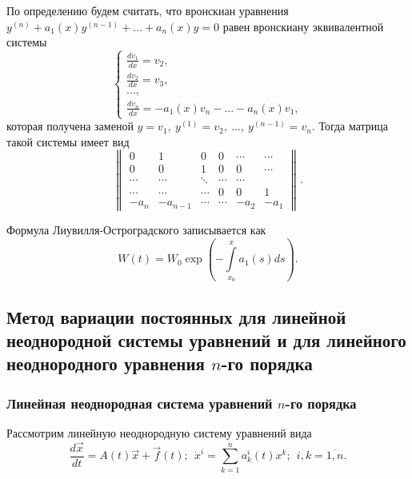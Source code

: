 По определению будем считать, что вронскиан уравнения $y^{(n)} + a_1(x) y^{(n - 1)} + \dots + a_n(x)y = 0$ равен вронскиану эквивалентной системы
\begin{equation*}
  \begin{cases}
    \frac{dv_1}{dx} = v_2,
    \\
    \frac{dv_2}{dx} = v_3,
    \\
    ...,
    \\
    \frac{dv_n}{dx} = - a_1(x)v_n - ... - a_n(x)v_1,
  \end{cases}
\end{equation*}
которая получена заменой $y = v_1, ~y^{(1)} = v_2,~..., ~y^{(n-1)} = v_n$. Тогда матрица такой системы имеет вид
\begin{equation*}
  \begin{Vmatrix*} 0 & 1 & 0 & 0 &\cdots & \cdots \\
                    0 & 0 & 1 & 0 & 0 & \cdots      \\
    \cdots & \cdots & \ddots & \cdots & \cdots \\
    \cdots & \cdots & \cdots & 0 & 0 & 1 \\ 
    -a_n & -a_{n-1} & \cdots & \cdots & -a_2 & -a_1
  \end{Vmatrix*}.
\end{equation*}

Формула Лиувилля-Остроградского записывается как
\begin{equation*}
  W(t) = W_0\exp{\left( -\int\limits_{x_0}^{x}a_1(s) ds\right)}.
\end{equation*}

\subsection{Метод вариации постоянных для линейной неоднородной системы уравнений и для линейного неоднородного уравнения $n$-го порядка}

\subsubsection{Линейная неоднородная система уравнений $n$-го порядка}

Рассмотрим линейную неоднородную систему уравнений вида
\begin{equation}
  \frac{d \overrightarrow x}{dt} = A(t) \overrightarrow x + \overrightarrow{f}(t); ~~ \dot x^i = \sum^n_{k = 1} a^i_k(t) x^k; ~~ i, k = \overline{1, n}.
  \label{4_4_var}
\end{equation}


